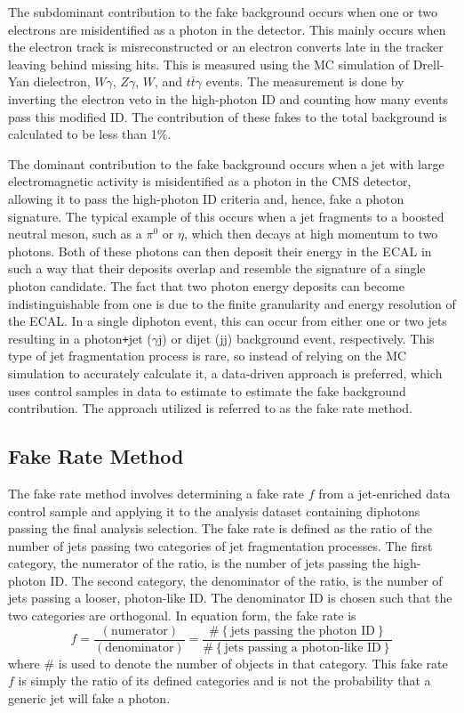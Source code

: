 The subdominant contribution to the fake background occurs when one or two electrons are misidentified as a photon in the detector. This mainly occurs when the electron track is misreconstructed or an electron converts late in the tracker leaving behind missing hits. This is measured using the MC simulation of Drell-Yan dielectron, $W\gamma$, $Z\gamma$, $W$, and $t\bar{t}\gamma$ events. The measurement is done by inverting the electron veto in the high-\pt photon ID and counting how many events pass this modified ID. The contribution of these fakes to the total background is calculated to be less than 1\%.

The dominant contribution to the fake background occurs when a jet with large electromagnetic activity is misidentified as a photon in the CMS detector, allowing it to pass the high-\pt photon ID criteria and, hence, fake a photon signature. The typical example of this occurs when a jet fragments to a boosted neutral meson, such as a $\pi^0$ or $\eta$, which then decays at high momentum to two photons. Both of these photons can then deposit their energy in the ECAL in such a way that their deposits overlap and resemble the signature of a single photon candidate. The fact that two photon energy deposits can become indistinguishable from one is due to the finite granularity and energy resolution of the ECAL. In a single diphoton event, this can occur from either one or two jets resulting in a photon\texttt{+}jet ($\gamma$j) or dijet (jj) background event, respectively. This type of jet fragmentation process is rare, so instead of relying on the MC simulation to accurately calculate it, a data-driven approach is preferred, which uses control samples in data to estimate to estimate the fake background contribution. The approach utilized is referred to as the fake rate method.


\subsection{Fake Rate Method}

The fake rate method involves determining a fake rate $f$ from a jet-enriched data control sample and applying it to the analysis dataset containing diphotons passing the final analysis selection. The fake rate is defined as the ratio of the number of jets passing two categories of jet fragmentation processes. The first category, the numerator of the ratio, is the number of jets passing the high-\pt photon ID. The second category, the denominator of the ratio, is the number of jets passing a looser, photon-like ID. The denominator ID is chosen such that the two categories are orthogonal. In equation form, the fake rate is
\begin{equation}
  f = \frac{(\text{numerator})}{(\text{denominator})} = \frac{\# \left\lbrace\text{jets passing the photon ID}\right\rbrace}{\# \left\lbrace\text{jets passing a photon-like ID}\right\rbrace}
\end{equation}
\noindent where \# is used to denote the number of objects in that category. This fake rate $f$ is simply the ratio of its defined categories and is not the probability that a generic jet will fake a photon.

